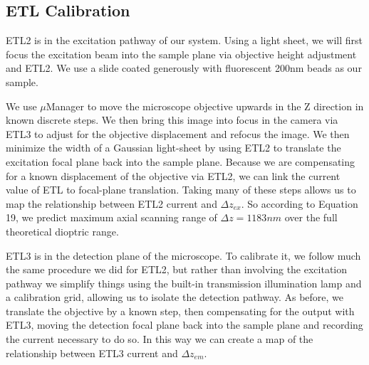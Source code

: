 \subsection{ETL Calibration}
ETL2 is in the excitation pathway of our system. Using a light sheet, we will first focus the excitation beam into the sample plane via objective height adjustment and ETL2. We use a slide coated generously with fluorescent 200nm beads as our sample.
\par We use $\mu$Manager\cite{uManager} to move the microscope objective upwards in the Z direction in known discrete steps. We then bring this image into focus in the camera via ETL3 to adjust for the objective displacement and refocus the image. We then minimize the width of a Gaussian light-sheet by using ETL2 to translate the excitation focal plane back into the sample plane. Because we are compensating for a known displacement of the objective via ETL2, we can link the current value of ETL to focal-plane translation. Taking many of these steps allows us to map the relationship between ETL2 current and $\Delta z_{ex}$. So according to Equation 19, we predict maximum axial scanning range of $\Delta z = 1183nm$ over the full theoretical dioptric range. \par
ETL3 is in the detection plane of the microscope. To calibrate it, we follow much the same procedure we did for ETL2, but rather than involving the excitation pathway we simplify things using the built-in transmission illumination lamp and a calibration grid, allowing us to isolate the detection pathway. As before, we translate the objective by a known step, then compensating for the output with ETL3, moving the detection focal plane back into the sample plane and recording the current necessary to do so. In this way we can create a map of the relationship between ETL3 current and $\Delta z_{em}$.
